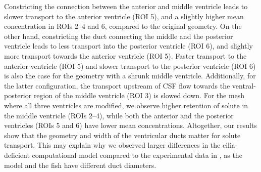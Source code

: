 \documentclass{WileyMSP-template}
\begin{document}
Constricting the connection between the anterior and middle ventricle leads to
slower transport to the anterior ventricle (ROI 5),
and a slightly higher mean concentration in ROIs 2--4 and 6, compared to the original geometry.
On the other hand, constricting the duct connecting the middle and the posterior ventricle
leads to less transport into the posterior ventricle (ROI 6),
and slightly more transport towards the anterior ventricle (ROI 5).
Faster transport to the anterior ventricle (ROI 5) and slower transport to the
posterior ventricle (ROI 6) is also the case for the geometry with a shrunk middle ventricle.
Additionally, for the latter configuration, the transport upstream of CSF flow towards the
ventral-posterior region of the middle ventricle (ROI 3) is slowed down.
For the mesh where all three ventricles are modified,
we observe higher retention of solute in the middle ventricle (ROIs 2--4),
while both the anterior and the posterior ventricles (ROIs 5 and 6) have lower mean concentrations.
Altogether, our results show that the geometry and width of the ventricular ducts matter
for solute transport. This may explain why we observed larger differences
in the cilia-deficient computational model compared to the experimental data in
, as the model and the fish have different duct diameters.
\end{document}
